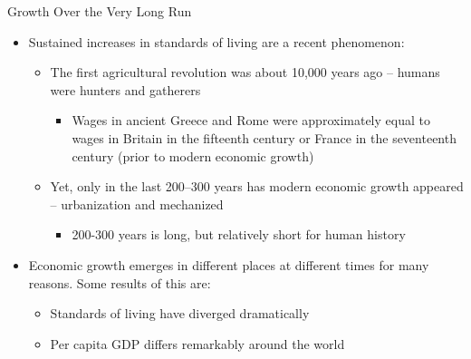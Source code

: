 \documentclass[aspectratio=1610]{beamer}
\begin{document}
\begin{frame}[wide]{Growth Over the Very Long Run}
	\begin{itemize}
		\item Sustained increases in standards of living are a recent phenomenon:
		\begin{itemize}
			\item The first agricultural revolution was about 10,000 years ago -- humans were hunters and gatherers
			\begin{itemize}
				\item Wages in ancient Greece and Rome were approximately equal to wages in Britain in the fifteenth century or France in the seventeenth century (prior to modern economic growth)
			\end{itemize}
			\item Yet, only in the last 200–300 years has modern economic growth appeared -- urbanization and mechanized
			\begin{itemize}
				\item 200-300 years is long, but relatively short for human history
			\end{itemize}
		\end{itemize}
		\item Economic growth emerges in different places at different times for many reasons.  Some results of this are:
		\begin{itemize}
			\item Standards of living have diverged dramatically
			\item Per capita GDP differs remarkably around the world
		\end{itemize}
		
	\end{itemize}
\end{frame}

%
%			
\end{document}
